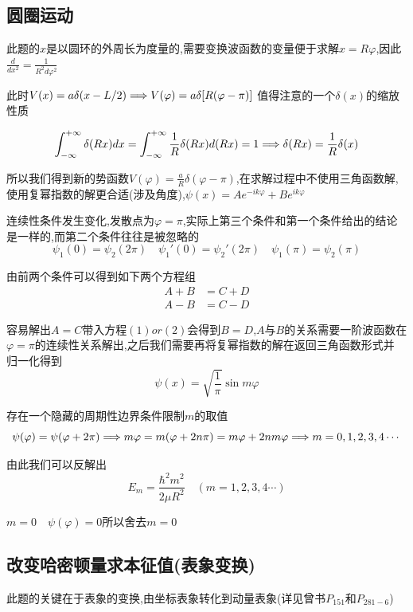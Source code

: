 \documentclass{article}
\begin{document}
        \subsection{圆圈运动}

        此题的$x$是以圆环的外周长为度量的,需要变换波函数的变量便于求解$x=R\varphi$,因此$\frac{d}{dx^{2}}=\frac{1}{R^{2}d\varphi^{2}}$

        此时$V(x)=a\delta(x-L/2) \Longrightarrow V(\varphi) = a \delta[R(\varphi-\pi)]$
        值得注意的一个$\delta(x)$的缩放性质
        \begin{formal}
            $$ \int_{-\infty}^{+\infty} \delta(Rx)dx = \int_{-\infty}^{+\infty} \frac{1}{R} \delta(Rx) d(Rx) = 1 \Longrightarrow \delta(Rx) = \frac{1}{R}\delta(x)$$
        \end{formal}

        所以我们得到新的势函数$V(\varphi) = \frac{a}{R} \delta(\varphi-\pi) $,在求解过程中不使用三角函数解,使用复幂指数的解更合适(涉及角度),\quad $\psi(x) = Ae^{-ik\varphi} + Be^{ik\varphi}$

        连续性条件发生变化,发散点为$\varphi = \pi$,实际上第三个条件和第一个条件给出的结论是一样的,而第二个条件往往是被忽略的
        $$ \psi_{1}(0) = \psi_{2}(2\pi) \quad \psi_{1}'(0) = \psi_{2}'(2\pi)\quad \psi_{1}(\pi) = \psi_{2}(\pi) $$
        
        由前两个条件可以得到如下两个方程组
        \begin{align}
            A+B&=C+D\\
            A-B&=C-D
        \end{align}

        容易解出$A=C$带入方程$(1)or(2)$会得到$B=D$,$A$与$B$的关系需要一阶波函数在$\varphi=\pi$的连续性关系解出,之后我们需要再将复幂指数的解在返回三角函数形式并
        归一化得到
        $$ \psi(x) = \sqrt{\frac{1}{\pi}} \sin{m \varphi} $$
        
        存在一个隐藏的周期性边界条件限制$m$的取值
        $$ \psi(\varphi) = \psi(\varphi+2\pi) \Longrightarrow m\varphi = m(\varphi+2n\pi) = m \varphi + 2nm\varphi  \Longrightarrow m = 0,1,2,3,4\cdots $$
        
        由此我们可以反解出
        $$ E_{m} = \frac{\hbar^{2} m^{2}}{2\mu R^{2}} \quad (m=1,2,3,4\cdots)$$

        $ m = 0 \quad \psi(\varphi) = 0 $所以舍去$m=0$

        \subsection{改变哈密顿量求本征值(表象变换)}
            此题的关键在于表象的变换,由坐标表象转化到动量表象(详见曾书$P_{151}$和$P_{281-6}$)
            
\end{document}
